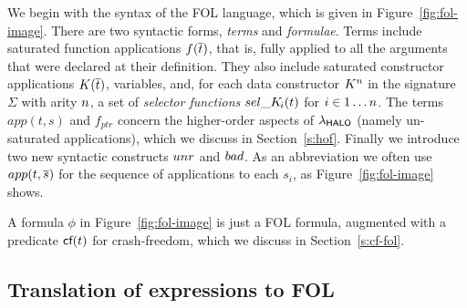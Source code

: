 We begin with the syntax of the FOL language, which is given in
Figure~\ref{fig:fol-image}. There are two syntactic forms,
\emph{terms} and \emph{formulae}. Terms include saturated function applications
$f(\overline{t})$, that is, fully applied to all the arguments that were declared at their
definition. They also include saturated constructor applications $K(\overline{t})$, 
variables, and, for each data constructor $K^n$ in the signature
$\Sigma$ with arity $n$, a set of {\em selector functions}
$\mathop{sel\_K\!_{i}}(t)$ for $i \in 1 \ldots n$.  The terms $app(t,s)$ and
$f_{ptr}$ concern the higher-order aspects of $\lambda_{\sf HALO}$
(namely un-saturated applications), which we
discuss in Section~\ref{s:hof}.  Finally we introduce two new
syntactic constructs $\mathop{unr}$ and $\mathop{bad}$. As an abbreviation we often use
$app(t,\overline{s})$ for the sequence of applications to each $s_i$, as
Figure~\ref{fig:fol-image} shows.

A formula $\phi$ in Figure~\ref{fig:fol-image} is just a FOL
formula, augmented with a predicate $\textsf{cf}(t)$ for crash-freedom, which
we discuss in Section~\ref{s:cf-fol}.

\subsection{Translation of expressions to FOL}\label{ssect:trans-exprs}

